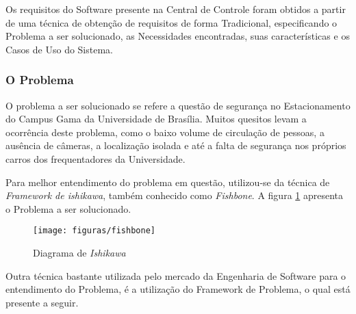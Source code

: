 Os requisitos do Software presente na Central de Controle foram obtidos a partir de uma técnica de obtenção de requisitos de forma Tradicional, especificando o Problema a ser solucionado, as Necessidades encontradas, suas características e os Casos de Uso do Sistema.

\subsubsection{O Problema}

	O problema a ser solucionado se refere a questão de segurança no Estacionamento do Campus Gama da Universidade de Brasília. Muitos quesitos levam a ocorrência deste problema, como o baixo volume de circulação de pessoas, a ausência de câmeras, a localização isolada e até a falta de segurança nos próprios carros dos frequentadores da Universidade.

	Para melhor entendimento do problema em questão, utilizou-se da técnica de \textit{Framework de ishikawa}, também conhecido como \textit{Fishbone}. A figura \ref{img:fishbone} apresenta o Problema a ser solucionado.

	\begin{figure}[H]
		\centering
		\texttt{[image: figuras/fishbone]}
		\caption{Diagrama de \textit{Ishikawa} }
		\label{img:fishbone}
	\end{figure}

	Outra técnica bastante utilizada pelo mercado da Engenharia de Software para o entendimento do Problema, é a utilização do Framework de Problema, o qual está presente a seguir.

